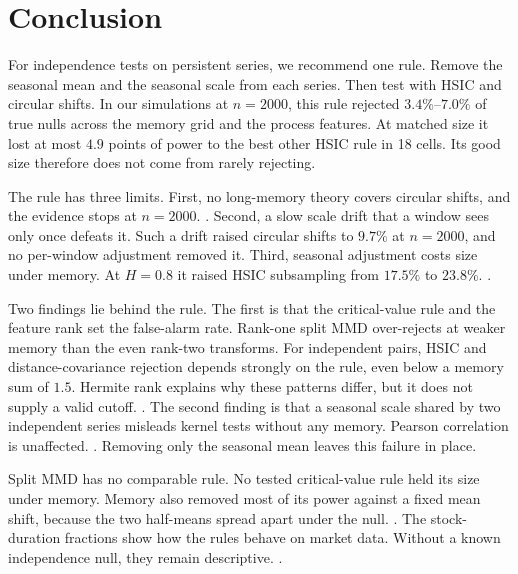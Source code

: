 
\section{Conclusion}
For independence tests on persistent series, we recommend one rule. Remove the seasonal mean and the seasonal scale from each series. Then test with HSIC and circular shifts. In our simulations at $n=2000$, this rule rejected $3.4\%$--$7.0\%$ of true nulls across the memory grid and the process features. At matched size it lost at most $4.9$ points of power to the best other HSIC rule in 18 cells. Its good size therefore does not come from rarely rejecting.

The rule has three limits. First, no long-memory theory covers circular shifts, and the evidence stops at $n=2000$. . Second, a slow scale drift that a window sees only once defeats it. Such a drift raised circular shifts to $9.7\%$ at $n=2000$, and no per-window adjustment removed it. Third, seasonal adjustment costs size under memory. At $H=0.8$ it raised HSIC subsampling from $17.5\%$ to $23.8\%$. .

Two findings lie behind the rule. The first is that the critical-value rule and the feature rank set the false-alarm rate. Rank-one split MMD over-rejects at weaker memory than the even rank-two transforms. For independent pairs, HSIC and distance-covariance rejection depends strongly on the rule, even below a memory sum of $1.5$. Hermite rank explains why these patterns differ, but it does not supply a valid cutoff. . The second finding is that a seasonal scale shared by two independent series misleads kernel tests without any memory. Pearson correlation is unaffected. . Removing only the seasonal mean leaves this failure in place.

Split MMD has no comparable rule. No tested critical-value rule held its size under memory. Memory also removed most of its power against a fixed mean shift, because the two half-means spread apart under the null. . The stock-duration fractions show how the rules behave on market data. Without a known independence null, they remain descriptive. .
